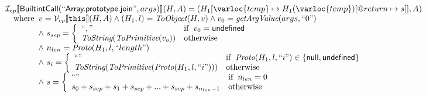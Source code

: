 \[\begin{array}{l}
\I _{cp}\lbr \SF{BuiltintCall}(``\SF{Array.prototype.join}",args)\rbr(H,A)
 = (H_1[\varloc{temp}\mapsto H_1(\varloc{temp})[\varprop{return}\mapsto s]], A) \\
\quad\wherec{
  v = \V _{cp}\lbr \TT{this}\rbr (H,A) \land (H_1,l) = \hf{ToObject}(H,v)
  \land v_0 = \hf{getArgValue}(args, ``0")\\
  \land\ s_{sep} = \left\{
    \begin{array}{ll}
      ``," & \ifc{v_0 = \SF{undefined}}\\
      \hf{ToString}(\hf{ToPrimitive}(v_o)) & \owc
    \end{array}
    \right.\\
  \land\ n_{len} = \hf{Proto}(H_1, l, ``length")\\
  \land\ s_i = \left\{\begin{array}{ll}
      ``" & \ifc{\hf{Proto}(H_1, l, ``i") \in \{ \SF{null}, \SF{undefined}\}}\\
      \hf{ToString}(\hf{ToPrimitive}(\hf{Proto}(H_1, l, ``i"))) & \owc
    \end{array}\right.\\
  \land\ s = \left\{\begin{array}{ll}
    ``" & \ifc{n_{len} = 0}\\
    s_0 + s_{sep} + s_1 + s_{sep} + ... + s_{sep} + s_{n_{len}-1} & \owc
    \end{array}\right.\\
  }\\
\\\\
\end{array}
\]


